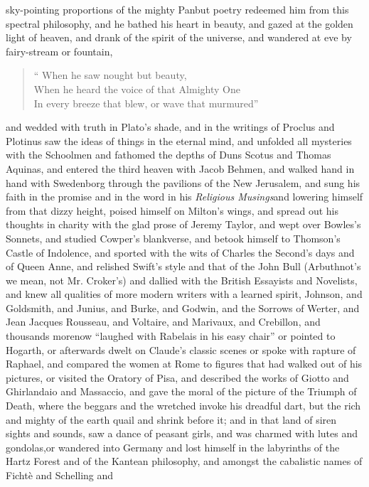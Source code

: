 sky-pointing proportions of the mighty Pan\textemdash but poetry redeemed
him from this spectral philosophy, and he bathed his heart in
beauty, and gazed at the golden light of heaven, and drank of the
spirit of the universe, and wandered at eve by fairy-stream or
fountain,
\begin{quote} %
  ``  When he saw nought but beauty, \\
  When he heard the voice of that Almighty One \\
  In every breeze that blew, or wave that murmured''\textemdash 
\end{quote}
and wedded with truth in Plato's shade, and in the writings of
Proclus and Plotinus saw the ideas of things in the eternal mind,
and unfolded all mysteries with the Schoolmen and fathomed the
depths of Duns Scotus and Thomas Aquinas, and entered the third
heaven with Jacob Behmen, and walked hand in hand with Swedenborg
through the pavilions of the New Jerusalem, and sung his faith in
the promise and in the word in his \emph{Religious Musings}\textemdash and
lowering himself from that dizzy height, poised himself on
Milton's wings, and spread out his thoughts in charity with the
glad prose of Jeremy Taylor, and wept over Bowles's Sonnets, and
studied Cowper's blankverse, and betook himself to Thomson's
Castle of Indolence, and sported with the wits of Charles the
Second's days and of Queen Anne, and relished Swift's style and
that of the John Bull (Arbuthnot's we mean, not Mr. Croker's) and
dallied with the British Essayists and Novelists, and knew all
qualities of more modern writers with a learned spirit, Johnson,
and Goldsmith, and Junius, and Burke, and Godwin, and the Sorrows
of Werter, and Jean Jacques Rousseau, and Voltaire, and Marivaux,
and Crebillon, and thousands more\textemdash now ``laughed with Rabelais in
his easy chair'' or pointed to Hogarth, or afterwards dwelt on
Claude's classic scenes or spoke with rapture of Raphael, and
compared the women at Rome to figures that had walked out of his
pictures, or visited the Oratory of Pisa, and described the works
of Giotto and Ghirlandaio and Massaccio, and gave the moral of the
picture of the Triumph of Death, where the beggars and the
wretched invoke his dreadful dart, but the rich and mighty of the
earth quail and shrink before it; and in that land of siren sights
and sounds, saw a dance of peasant girls, and was charmed with
lutes and gondolas,\textemdash or wandered into Germany and lost himself in
the labyrinths of the Hartz Forest and of the Kantean philosophy,
and amongst the cabalistic names of Fichtè and Schelling and
